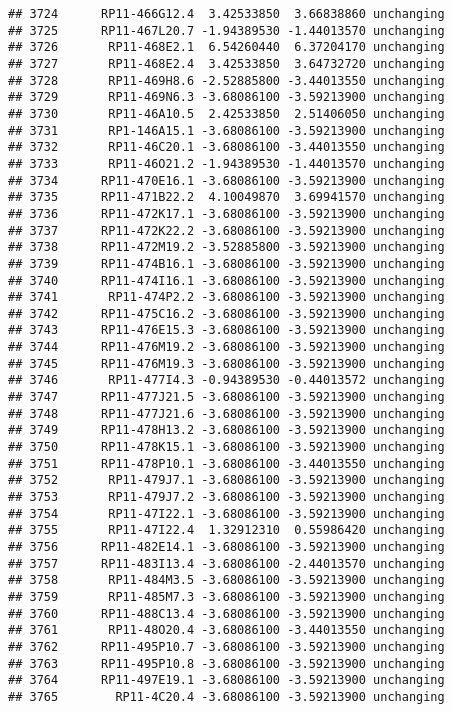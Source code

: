 \documentclass[]{article}
\begin{document}
\begin{verbatim}
## 3724      RP11-466G12.4  3.42533850  3.66838860 unchanging
## 3725      RP11-467L20.7 -1.94389530 -1.44013570 unchanging
## 3726       RP11-468E2.1  6.54260440  6.37204170 unchanging
## 3727       RP11-468E2.4  3.42533850  3.64732720 unchanging
## 3728       RP11-469H8.6 -2.52885800 -3.44013550 unchanging
## 3729       RP11-469N6.3 -3.68086100 -3.59213900 unchanging
## 3730       RP11-46A10.5  2.42533850  2.51406050 unchanging
## 3731       RP1-146A15.1 -3.68086100 -3.59213900 unchanging
## 3732       RP11-46C20.1 -3.68086100 -3.44013550 unchanging
## 3733       RP11-46O21.2 -1.94389530 -1.44013570 unchanging
## 3734      RP11-470E16.1 -3.68086100 -3.59213900 unchanging
## 3735      RP11-471B22.2  4.10049870  3.69941570 unchanging
## 3736      RP11-472K17.1 -3.68086100 -3.59213900 unchanging
## 3737      RP11-472K22.2 -3.68086100 -3.59213900 unchanging
## 3738      RP11-472M19.2 -3.52885800 -3.59213900 unchanging
## 3739      RP11-474B16.1 -3.68086100 -3.59213900 unchanging
## 3740      RP11-474I16.1 -3.68086100 -3.59213900 unchanging
## 3741       RP11-474P2.2 -3.68086100 -3.59213900 unchanging
## 3742      RP11-475C16.2 -3.68086100 -3.59213900 unchanging
## 3743      RP11-476E15.3 -3.68086100 -3.59213900 unchanging
## 3744      RP11-476M19.2 -3.68086100 -3.59213900 unchanging
## 3745      RP11-476M19.3 -3.68086100 -3.59213900 unchanging
## 3746       RP11-477I4.3 -0.94389530 -0.44013572 unchanging
## 3747      RP11-477J21.5 -3.68086100 -3.59213900 unchanging
## 3748      RP11-477J21.6 -3.68086100 -3.59213900 unchanging
## 3749      RP11-478H13.2 -3.68086100 -3.59213900 unchanging
## 3750      RP11-478K15.1 -3.68086100 -3.59213900 unchanging
## 3751      RP11-478P10.1 -3.68086100 -3.44013550 unchanging
## 3752       RP11-479J7.1 -3.68086100 -3.59213900 unchanging
## 3753       RP11-479J7.2 -3.68086100 -3.59213900 unchanging
## 3754       RP11-47I22.1 -3.68086100 -3.59213900 unchanging
## 3755       RP11-47I22.4  1.32912310  0.55986420 unchanging
## 3756      RP11-482E14.1 -3.68086100 -3.59213900 unchanging
## 3757      RP11-483I13.4 -3.68086100 -2.44013570 unchanging
## 3758       RP11-484M3.5 -3.68086100 -3.59213900 unchanging
## 3759       RP11-485M7.3 -3.68086100 -3.59213900 unchanging
## 3760      RP11-488C13.4 -3.68086100 -3.59213900 unchanging
## 3761       RP11-48O20.4 -3.68086100 -3.44013550 unchanging
## 3762      RP11-495P10.7 -3.68086100 -3.59213900 unchanging
## 3763      RP11-495P10.8 -3.68086100 -3.59213900 unchanging
## 3764      RP11-497E19.1 -3.68086100 -3.59213900 unchanging
## 3765        RP11-4C20.4 -3.68086100 -3.59213900 unchanging

\end{verbatim}
\end{document}
